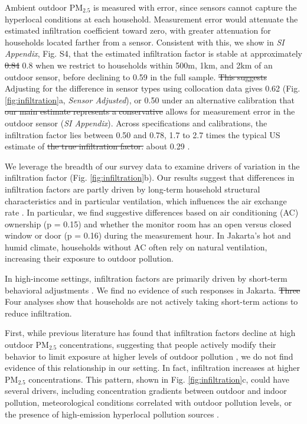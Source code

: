 \documentclass[9pt,twocolumn,twoside]{pnas-new}
\providecommand{\DIFadd}[1]{{\protect\color{red}#1}}
\providecommand{\DIFdel}[1]{{\protect\color{red}\protect\sout{#1}}}
\begin{document}
Ambient outdoor PM$_{2.5}$ is measured with error, since sensors cannot capture the hyperlocal conditions at each household. Measurement error would attenuate the estimated infiltration coefficient toward zero, with greater attenuation for households located farther from a sensor. Consistent with this, we show in \textit{SI Appendix}, Fig. S4, that the estimated infiltration factor is stable at approximately \DIFdel{0.84} \DIFadd{0.8} when we restrict to households within 500m, 1km, and 2km of an outdoor sensor, before declining to 0.59 in the full sample. \DIFdel{This suggests} 
\DIFadd{Adjusting for the difference in sensor types using collocation data gives 0.62 (Fig. \ref{fig:infiltration}a,} \textit{\DIFadd{Sensor Adjusted}}\DIFadd{), or 0.50 under an alternative calibration} that \DIFdel{our main estimate represents a conservative} \DIFadd{allows for measurement error in the outdoor sensor (}\textit{\DIFadd{SI Appendix}}\DIFadd{). Across specifications and calibrations, the infiltration factor lies between 0.50 and 0.78, 1.7 to 2.7 times the typical US} estimate of \DIFdel{the true infiltration factor.} \DIFadd{about 0.29 \citep{lunderberg_assessing_2023}.}

We leverage the breadth of our survey data to examine drivers of variation in the infiltration factor (Fig. \ref{fig:infiltration}b). 
Our results suggest that differences in infiltration factors are partly driven by long-term household structural characteristics and in particular ventilation, which influences the air exchange rate \citep{chen_review_2011}. In particular, we find suggestive differences based on air conditioning (AC) ownership (p = 0.15) and whether the monitor room has an open versus closed window or door (p = 0.16) during the measurement hour. In Jakarta’s hot and humid climate, households without AC often rely on natural ventilation, increasing their exposure to outdoor pollution.

In high-income settings, infiltration factors are primarily driven by short-term behavioral adjustments \citep{burke_exposures_2022, baquie_know_2024}. We find no evidence of such responses in Jakarta. \DIFdel{Three} \DIFadd{Four} analyses show that households are not actively taking short-term actions to reduce infiltration.

First, while previous literature has found that infiltration factors decline at high outdoor PM$_{2.5}$ concentrations, suggesting that people actively modify their behavior to limit exposure at higher levels of outdoor pollution \citep{burke_exposures_2022,lunderberg_assessing_2023}, we do not find evidence of this relationship in our setting. In fact, infiltration increases at higher PM$_{2.5}$ concentrations. This pattern, shown in Fig. \ref{fig:infiltration}c, could have several drivers, including concentration gradients between outdoor and indoor pollution, meteorological conditions correlated with outdoor pollution levels, or the presence of high-emission hyperlocal pollution sources \citep{lunderberg_assessing_2023,macneill_factors_2012}.
\end{document}
